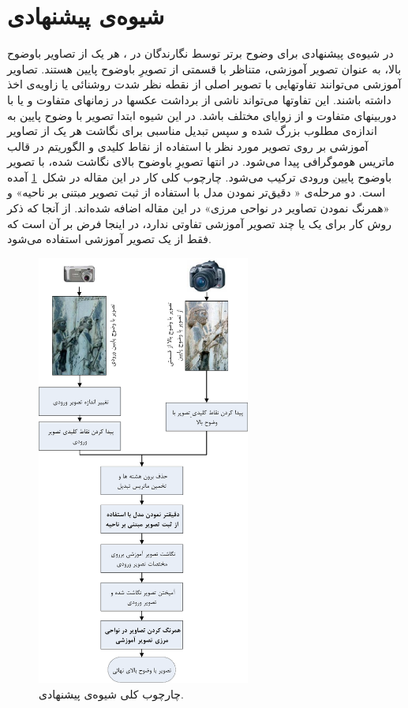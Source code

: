 \documentclass[11pt,a4paper,twocolumn]{article}
\newcommand{\fused}{آمیخته }
\begin{document}
\section{شیوه‌ی پیشنهادی}\label{Sec:TheProposedMethod}
 در شیوه‌ی پیشنهادی برای وضوح برتر توسط نگارندگان در \cite{Amintoosi08reconstruction}، هر یک از تصاویر باوضوح بالا، به عنوان تصویر آموزشی، متناظر با قسمتی از تصویرِ باوضوح پایین هستند.  تصاویر آموزشی می‌توانند تفاوتهایی با تصویر اصلی از نقطه نظر شدت روشنائی یا زاویه‌ی اخذ داشته باشند. 
 این تفاوتها می‌تواند ناشی از برداشت عکسها در زمانهای متفاوت و یا با دوربینهای متفاوت و از زوایای مختلف باشد. در این شیوه ابتدا تصویر با وضوح پایین به اندازه‌ی مطلوب بزرگ شده و سپس  تبدیل مناسبی برای نگاشت هر یک از تصاویر آموزشی بر روی تصویر مورد نظر با استفاده از  نقاط کلیدی  و الگوریتم  در قالب ماتریس هوموگرافی
 پیدا می‌شود. در انتها تصویرِِ باوضوح بالای نگاشت شده، با تصویر باوضوح پایین ورودی
ترکیب می‌شود.
 چارچوب کلی کار در این مقاله در شکل~\ref{fig:OneLR_oneHR} آمده است. دو مرحله‌ی « دقیق‌تر نمودن مدل با استفاده از ثبت تصویر مبتنی بر ناحیه» و «همرنگ نمودن تصاویر در نواحی مرزی» در این مقاله اضافه شده‌اند. از آنجا که ذکر روش کار برای یک یا چند تصویر آموزشی تفاوتی ندارد، در اینجا فرض بر آن است که فقط از یک تصویر آموزشی استفاده می‌شود.

\begin{figure}[t]
\centering 
\includegraphics[width=70mm]{Images/OneLR_oneHR.pdf}
\caption{چارچوب کلی شیوه‌ی پیشنهادی.}\label{fig:OneLR_oneHR}
\end{figure}
\end{document}
